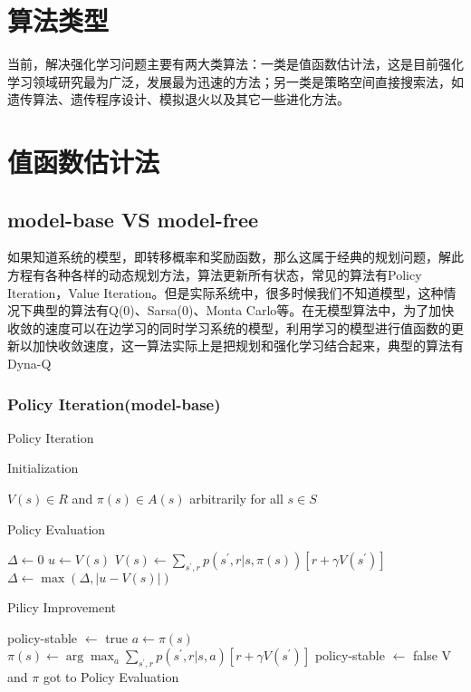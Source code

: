 \documentclass{article} %
\begin{document}
\begin{CJK*}{UTF8}{gkai}
\section{算法类型}
当前，解决强化学习问题主要有两大类算法：一类是值函数估计法，这是目前强化学习领域研究最为广泛，发展最为迅速的方法；另一类是策略空间直接搜索法，如遗传算法、遗传程序设计、模拟退火以及其它一些进化方法。

\section{值函数估计法}
\subsection{model-base VS model-free}
如果知道系统的模型，即转移概率和奖励函数，那么这属于经典的规划问题，解此方程有各种各样的动态规划方法，算法更新所有状态，常见的算法有Policy Iteration，Value Iteration。但是实际系统中，很多时候我们不知道模型，这种情况下典型的算法有Q(0)、Sarsa(0)、Monta Carlo等。在无模型算法中，为了加快收敛的速度可以在边学习的同时学习系统的模型，利用学习的模型进行值函数的更新以加快收敛速度，这一算法实际上是把规划和强化学习结合起来，典型的算法有Dyna-Q
\subsubsection{Policy Iteration(model-base)}
\begin{algorithm}
    \caption{Policy Iteration}
    \label{alg1}
    Initialization
    \begin{algorithmic}[1]
        \STATE  $V\left(s\right)\in R$ and $\pi\left(s\right)\in A\left(s\right)$ arbitrarily for all $s \in S$
    \end{algorithmic}
    Policy Evaluation
    \begin{algorithmic}[1]
        \REPEAT  
            \STATE $\Delta \gets 0$
                \STATE $u \gets V\left(s\right)$
                \STATE $V\left(s\right) \gets \sum _{s ^{\prime},r}p\left(s ^{\prime},r \vert s,\pi \left(s\right)\right)\left[r+\gamma V\left(s ^{\prime}\right) \right]$
                \STATE $\Delta \gets \max\left(\Delta,\vert u - V\left(s\right)\vert\right)$
            \ENDFOR
    \end{algorithmic}
    Pilicy Improvement
    \begin{algorithmic}[1]
        \STATE policy-stable $\gets$ true
            \STATE $a \gets \pi\left(s\right)$
            \STATE $\pi\left(s\right) \gets \arg\max _{a}\sum _{s ^{\prime},r}p\left(s ^{\prime},r \vert s,a\right)\left[r+\gamma V\left(s ^{\prime}\right) \right]$
                \STATE policy-stable $\gets$ false
            \ENDIF
        \ENDFOR
            \RETURN V and $\pi$
        \ELSE
            \STATE got to Policy Evaluation
        \ENDIF
    \end{algorithmic}
\end{algorithm}


\end{CJK*}
\end{document}
